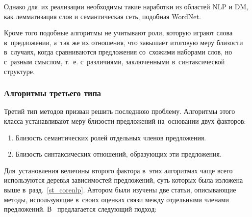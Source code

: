 Однако для~их реализации необходимы такие наработки из областей NLP и DM,
как лемматизация слов и семантическая сеть, подобная WordNet\cite{wordnet}.


Кроме того подобные алгоритмы не учитывают роли, которую играют слова в~предложении,
а~так же их отношения, что завышает итоговую меру близости в~случаях,
когда сравниваются предложения со~схожими наборами слов, но с~разным смыслом,
т.~е. с~различиями, заключенными в~синтаксической структуре.

\subsubsection{Алгоритмы третьего типа}
\label{sec:third_type_algorithm}
Третий тип методов призван решить последнюю проблему. 
Алгоритмы этого класса устанавливают меру близости предложений на~основании двух факторов:

\begin{enumerate}

\item{
Близость семантических ролей отдельных членов предложения.
}

\item{
Близость синтаксических отношений, образующих эти предложения.
}

\end{enumerate}

Для~установления величины второго фактора в~этих алгоритмах чаще всего используются
деревья зависимостей предложений, суть которых была изложена выше в~разд.~\ref{st_corenlp}.
Автором были изучены две статьи, описывающие методы, 
использующие в~своих оценках связи между отдельными членами предложений.
В~\cite{weightedDep} предлагается следующий подход:


